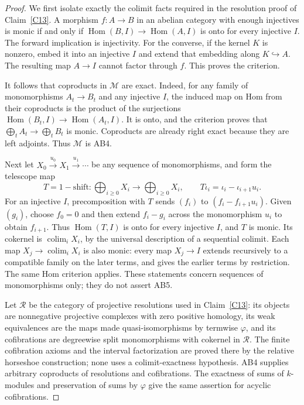 \begin{proof}
We first isolate exactly the colimit facts required in the resolution proof of Claim~\ref{C13}. A morphism $f:A\to B$ in an abelian category with enough injectives is monic if and only if $\operatorname{Hom}(B,I)\to\operatorname{Hom}(A,I)$ is onto for every injective $I$. The forward implication is injectivity. For the converse, if the kernel $K$ is nonzero, embed it into an injective $I$ and extend that embedding along $K\hookrightarrow A$. The resulting map $A\to I$ cannot factor through $f$. This proves the criterion.

It follows that coproducts in $\mathcal M$ are exact. Indeed, for any family of monomorphisms $A_t\to B_t$ and any injective $I$, the induced map on Hom from their coproducts is the product of the surjections $\operatorname{Hom}(B_t,I)\to\operatorname{Hom}(A_t,I)$. It is onto, and the criterion proves that $\bigoplus_t A_t\to\bigoplus_t B_t$ is monic. Coproducts are already right exact because they are left adjoints. Thus $\mathcal M$ is AB4.

Next let $X_0\xrightarrow{u_0}X_1\xrightarrow{u_1}\cdots$ be any sequence of monomorphisms, and form the telescope map
\[
 T=1-\mathrm{shift}:\bigoplus_{i\geq0}X_i
       \longrightarrow\bigoplus_{i\geq0}X_i,
 \qquad T\iota_i=\iota_i-\iota_{i+1}u_i.
\]
For an injective $I$, precomposition with $T$ sends $(f_i)$ to $(f_i-f_{i+1}u_i)$. Given $(g_i)$, choose $f_0=0$ and then extend $f_i-g_i$ across the monomorphism $u_i$ to obtain $f_{i+1}$. Thus $\operatorname{Hom}(T,I)$ is onto for every injective $I$, and $T$ is monic. Its cokernel is $\operatorname{colim}_iX_i$, by the universal description of a sequential colimit. Each map $X_j\to\operatorname{colim}_iX_i$ is also monic: every map $X_j\to I$ extends recursively to a compatible family on the later terms, and gives the earlier terms by restriction. The same Hom criterion applies. These statements concern sequences of monomorphisms only; they do not assert AB5.

Let $\mathcal R$ be the category of projective resolutions used in Claim~\ref{C13}: its objects are nonnegative projective complexes with zero positive homology, its weak equivalences are the maps made quasi-isomorphisms by termwise $\varphi$, and its cofibrations are degreewise split monomorphisms with cokernel in $\mathcal R$. The finite cofibration axioms and the interval factorization are proved there by the relative horseshoe construction; none uses a colimit-exactness hypothesis. AB4 supplies arbitrary coproducts of resolutions and cofibrations. The exactness of sums of $k$-modules and preservation of sums by $\varphi$ give the same assertion for acyclic cofibrations.


\end{proof}
